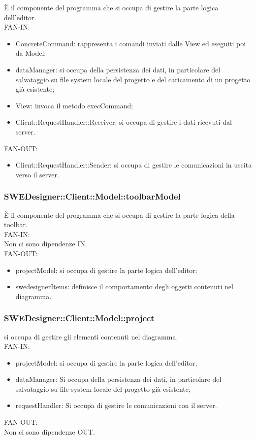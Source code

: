 \documentclass[../DefinizioneDiProdotto.tex]{subfiles}
\begin{document}
				È il componente del programma che si occupa di gestire la parte logica dell’editor.\\
					FAN-IN:
					\begin{itemize}
						\item ConcreteCommand: rappresenta i comandi inviati dalle View ed eseguiti poi da Model;
						\item dataManager: si occupa della persistenza dei dati, in particolare del salvataggio su file system locale del progetto e del caricamento di un progetto già esistente;
						\item View: invoca il metodo execCommand;
						\item Client::RequestHandler::Receiver: si occupa di gestire i dati ricevuti dal server.
					\end{itemize}
					FAN-OUT:
					\begin{itemize}
						\item Client::RequestHandler::Sender: si occupa di gestire le comunicazioni in uscita verso il server.
					\end{itemize}

				\subsubsection{SWEDesigner::Client::Model::toolbarModel}
				\hypertarget{SWEDesigner::Client::Model::toolbarModel}{}
				È il componente del programma che si occupa di gestire la parte logica della toolbar.\\
					FAN-IN:\\
					Non ci sono dipendenze IN. \\
					FAN-OUT:
					\begin{itemize}
						\item projectModel: si occupa di gestire la parte logica dell'editor;
						\item swedesignerItems: definisce il comportamento degli oggetti contenuti nel diagramma.
					\end{itemize}

				\subsubsection{SWEDesigner::Client::Model::project}
				si occupa di gestire gli elementi contenuti nel diagramma.\\
					FAN-IN:
					\begin{itemize}
						\item projectModel: si occupa di gestire la parte logica dell'editor;
						\item dataManager: Si occupa della persistenza dei dati, in particolare del salvataggio su file system locale del progetto già esistente;
						\item requestHandler: Si occupa di gestire le comunicazioni con il server.
					\end{itemize}
					FAN-OUT:\\
					Non ci sono dipendenze OUT. \\
				
\end{document}
